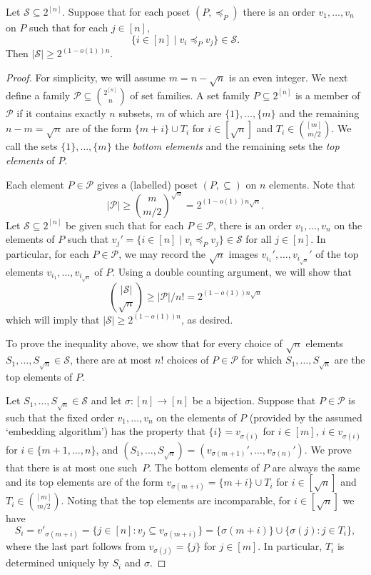 \documentclass[11pt]{article}
\newcommand{\cS}{\ensuremath{\mathcal S}}
\newcommand{\1}{\mathbbm{1}}
\def\cleq{\preccurlyeq}
\begin{document}
\begin{proposition}
    Let $\mathcal{S}\subseteq 2^{[n]}$. Suppose that for each poset $(P,\cleq_P)$ there is an order $v_1,\dots,v_n$ on $P$ such that for each $j\in [n]$,
\[
\{i\in [n]\mid v_i\cleq_Pv_j\}\in \mathcal{S}.
\]
Then $|\mathcal{S}|\geq 2^{(1-o(1))n}$.
\end{proposition}
\begin{proof}
For simplicity, we will assume $m=n-\sqrt{n}$ is an even integer. We next define a family $\mathcal{P}\subseteq \binom{2^{[n]}}{n}$ of set families. A set family $P\subseteq 2^{[n]}$ is a member of $\mathcal{P}$ if it contains exactly $n$ subsets, $m$ of which are $\{1\},\dots,\{m\}$ and the remaining $n-m=\sqrt{n}$ are of the form $\{m+i\}\cup T_i$ for $i\in [\sqrt{n}]$ and $T_i\in \binom{[m]}{m/2}$. We call the sets $\{1\},\dots,\{m\}$ the \textit{bottom elements} and the remaining sets the \textit{top elements} of $P$.

Each element $P\in \mathcal{P}$ gives a (labelled) poset $(P,\subseteq )$ on $n$ elements. 
Note that
\[
|\mathcal{P}|\geq 
\binom{m}{m/2}^{\sqrt{n}}=
2^{(1-o(1))n\sqrt{n}}.
\]
Let $\mathcal{S}\subseteq 2^{[n]}$ be given such that for each $P\in \mathcal{P}$, there is an order $v_1,\dots,v_n$ on the elements of $P$ such that $v_j'=\{i\in [n]\mid v_i\cleq_P v_j\}\in \mathcal{S}$ for all $j\in [n]$. 
In particular, for each $P\in \mathcal{P}$, we may record the $\sqrt{n}$ images $v_{i_1}',\dots,v_{i_{\sqrt{n}}}'$ of the top elements $v_{i_1},\dots,v_{i_{\sqrt{n}}}$ of $P$. Using a double counting argument, we will show that 
\[
\binom{|\cS|}{\sqrt{n}} \geq |\mathcal{P}|/n!=2^{(1-o(1))n\sqrt{n}}
\]
which will imply that $|\cS|\geq 2^{(1-o(1))n}$, as desired.

To prove the inequality above, we show that for every choice of $\sqrt{n}$ elements $S_1,\dots,S_{\sqrt{n}}\in \mathcal{S}$, there are at most $n!$ choices of $P\in \mathcal{P}$ for which $S_1,\dots ,S_{\sqrt{n}}$ are the top elements of $P$.

Let $S_1,\dots,S_{\sqrt{n}}\in \mathcal{S}$ and let $\sigma:[n]\to[n]$ be a bijection. Suppose that $P\in \mathcal{P}$ is such that the fixed order $v_1,\dots,v_n$ on the elements of $P$ (provided by the assumed `embedding algorithm') has the property that $\{i\}=v_{\sigma(i)}$ for $i\in [m]$, $i \in v_{\sigma(i)}$ for $i \in \{m+1, \ldots, n\}$, and 
$(S_1,\dots,S_{\sqrt{n}})=(v_{\sigma(m+1)}',\dots,v_{\sigma(n)}')$. 
We prove that there is at most one such~$P$. The bottom elements of $P$ are always the same and its top elements are of the form  $v_{\sigma(m + i)}=\{m+i\}\cup T_i$ for $i\in [\sqrt{n}]$ and $T_i\in \binom{[m]}{m/2}$. Noting that the top elements are incomparable, for $i\in [\sqrt{n}]$ we have \[
S_i=v'_{\sigma(m+i)}=\{j\in [n]:v_j\subseteq v_{\sigma(m + i)}\}=\{\sigma(m + i)\}\cup\{\sigma(j) : j \in T_i\},
\]
where the last part follows from $v_{\sigma(j)} = \{j\}$ for $j \in [m]$. In particular, $T_i$ is determined uniquely by $S_i$ and $\sigma$.
\end{proof}
\end{document}
